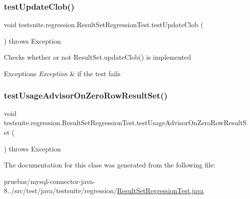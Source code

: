 \subsubsection{\texorpdfstring{test\+Update\+Clob()}{testUpdateClob()}}
{\footnotesize\ttfamily void testsuite.\+regression.\+Result\+Set\+Regression\+Test.\+test\+Update\+Clob (\begin{DoxyParamCaption}{ }\end{DoxyParamCaption}) throws Exception}

Checks whether or not Result\+Set.\+update\+Clob() is implemented


\begin{DoxyExceptions}{Exceptions}
{\em Exception} & if the test fails \\
\hline
\end{DoxyExceptions}
\mbox{\label{classtestsuite_1_1regression_1_1_result_set_regression_test_a9a179a9951b69e2e8b0d914aef3ac482}} 
\subsubsection{\texorpdfstring{test\+Usage\+Advisor\+On\+Zero\+Row\+Result\+Set()}{testUsageAdvisorOnZeroRowResultSet()}}
{\footnotesize\ttfamily void testsuite.\+regression.\+Result\+Set\+Regression\+Test.\+test\+Usage\+Advisor\+On\+Zero\+Row\+Result\+Set (\begin{DoxyParamCaption}{ }\end{DoxyParamCaption}) throws Exception}



The documentation for this class was generated from the following file\+:\begin{DoxyCompactItemize}
\item 
pruebas/mysql-\/connector-\/java-\/8../src/test/java/testsuite/regression/\mbox{\hyperlink{_result_set_regression_test_8java}{Result\+Set\+Regression\+Test.\+java}}\end{DoxyCompactItemize}
